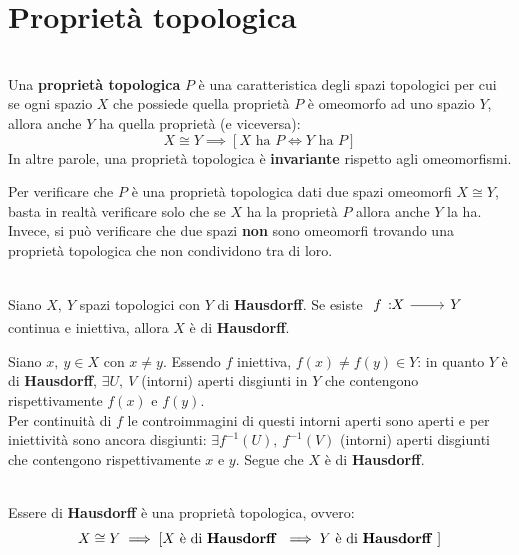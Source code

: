 \section{Proprietà topologica}
\begin{define}~{}\\
Una \textbf{proprietà topologica} $P$ è una caratteristica degli spazi topologici per cui se ogni spazio $X$ che possiede quella proprietà $P$ è omeomorfo ad uno spazio $Y$, allora anche $Y$ ha quella proprietà (e viceversa):
\begin{equation}
X\cong Y\implies \left[ X\text{ ha }P\iff Y\text{ ha }P\right]
\end{equation}
In altre parole, una proprietà topologica è \textbf{invariante} rispetto agli omeomorfismi.
\end{define}
\begin{observe}
Per verificare che $P$ è una proprietà topologica dati due spazi omeomorfi $X\cong Y$, basta in realtà verificare solo che se $X$ ha la proprietà $P$ allora anche $Y$ la ha.\\
Invece, si può verificare che due spazi \textbf{non} sono omeomorfi trovando una proprietà topologica che non condividono tra di loro.
\end{observe}
\begin{lemming}~{}\label{hausexercise}\\
Siano $X,\ Y$ spazi topologici con $Y$ di \textbf{Hausdorff}. Se esiste $\funz{f}{X}{Y}$ continua e iniettiva, allora $X$ è di \textbf{Hausdorff}.
\end{lemming}
\begin{demonstration}
Siano $x,\ y\in X$ con $x\neq y$. Essendo $f$ iniettiva, $f\left(x\right)\neq f\left(y\right)\in Y$: in quanto $Y$ è di \textbf{Hausdorff}, $\exists U,\ V$ (intorni) aperti disgiunti in $Y$ che contengono rispettivamente $f\left(x\right)$ e $f\left(y\right)$.\\
Per continuità di $f$ le controimmagini di questi intorni aperti sono aperti e per iniettività sono ancora disgiunti: $\exists f^{-1}\left(U\right),\ f^{-1}\left(V\right)$ (intorni) aperti disgiunti che contengono rispettivamente $x$ e $y$. Segue che $X$ è di \textbf{Hausdorff}.
\end{demonstration}
\begin{proposition}~{}\\
Essere di \textbf{Hausdorff} è una proprietà topologica, ovvero:
\begin{equation}
	X\cong Y\implies \left[ X\text{ è di \textbf{Hausdorff} }\implies Y\text{ è di \textbf{Hausdorff} }\right]
\end{equation}
\vspace{-6mm}
\end{proposition}
